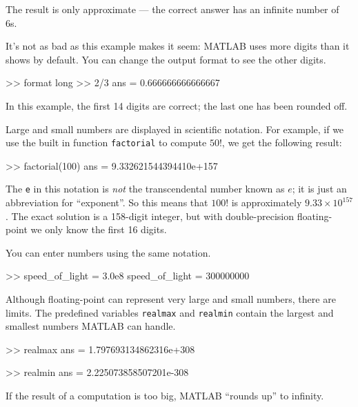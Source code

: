 \documentclass[main.tex]{subfiles}
\begin{document}
The result is only approximate --- the correct answer has an infinite number of 6s. 

It's not as bad as this example makes it seem: MATLAB uses more digits than it shows by default.
You can change the output format to see the other digits.


\begin{code}
>> format long
>> 2/3
ans = 0.666666666666667
\end{code}

In this example, the first 14 digits are correct; the last one has been rounded off.


Large and small numbers are displayed in scientific notation.  For example, if we use the built in function {\tt factorial} to compute $50!$, we get the following result:

\begin{code}
>> factorial(100)
ans = 9.332621544394410e+157
\end{code}

The {\tt e} in this notation is {\em not} the transcendental number
known as $e$; it is just an abbreviation for ``exponent''.  So
this means that $100!$ is approximately $9.33 \times 10^{157}$.  The
exact solution is a 158-digit integer, but with double-precision floating-point we only know the first 16 digits.


You can enter numbers using the same notation.

\begin{code}
>> speed_of_light = 3.0e8
speed_of_light = 300000000
\end{code}

Although floating-point can represent very large and small numbers, 
there are limits.  
The predefined variables {\tt realmax} and {\tt realmin}
contain the largest and smallest numbers MATLAB 
can handle.


\begin{code}
>> realmax
ans = 1.797693134862316e+308

>> realmin
ans = 2.225073858507201e-308
\end{code}

If the result of a computation is too big, MATLAB ``rounds up''
to infinity.
\end{document}
